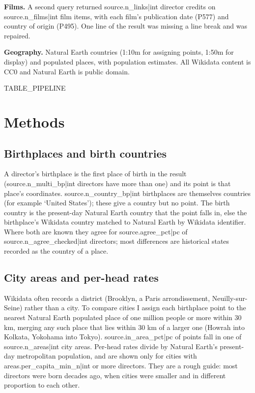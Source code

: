 \documentclass[11pt,a4paper]{article}
\begin{document}
\textbf{Films.} A second query returned {{source.n_links|int}} director credits on {{source.n_films|int}} film items, with each film's publication date (P577) and country of origin (P495). One line of the result was missing a line break and was repaired.

\textbf{Geography.} Natural Earth \citep{naturalearth} countries (1:10m for assigning points, 1:50m for display) and populated places, with population estimates. All Wikidata content is CC0 and Natural Earth is public domain.

{{TABLE_PIPELINE}}

\section{Methods}
\subsection{Birthplaces and birth countries}
A director's birthplace is the first place of birth in the result ({{source.n_multi_bp|int}} directors have more than one) and its point is that place's coordinates. {{source.n_country_bp|int}} birthplaces are themselves countries (for example `United States'); these give a country but no point. The birth country is the present-day Natural Earth country that the point falls in, else the birthplace's Wikidata country matched to Natural Earth by Wikidata identifier. Where both are known they agree for {{source.agree_pct|pc}} of {{source.n_agree_checked|int}} directors; most differences are historical states recorded as the country of a place.

\subsection{City areas and per-head rates}
Wikidata often records a district (Brooklyn, a Paris arrondissement, Neuilly-sur-Seine) rather than a city. To compare cities I assign each birthplace point to the nearest Natural Earth populated place of one million people or more within 30 km, merging any such place that lies within 30 km of a larger one (Howrah into Kolkata, Yokohama into Tokyo). {{source.in_area_pct|pc}} of points fall in one of {{source.n_areas|int}} city areas. Per-head rates divide by Natural Earth's present-day metropolitan population, and are shown only for cities with {{areas.per_capita_min_n|int}} or more directors. They are a rough guide: most directors were born decades ago, when cities were smaller and in different proportion to each other.
\end{document}
